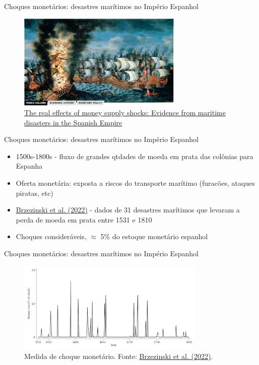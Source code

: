 \documentclass[10pt]{beamer}
\begin{document}
\begin{frame}
    {Choques monetários: desastres marítimos no Império Espanhol}
    \begin{figure}
        \centering
        \includegraphics[width=0.7\textwidth]{./figures/aula3_fig9}
        \caption{\href{https://cepr.org/voxeu/columns/real-effects-money-supply-shocks-evidence-maritime-disasters-spanish-empire}{The real effects of money supply shocks: Evidence from maritime disasters in the Spanish Empire}}
        \label{aula3_fig9}
    \end{figure}
\end{frame}

\begin{frame}
    {Choques monetários: desastres marítimos no Império Espanhol}
    \begin{itemize}
        \item 1500s-1800s - fluxo de grandes qtdades de moeda em prata das colônias para Espanha\bigskip
        \item Oferta monetária: exposta a riscos do transporte marítimo (furacões, ataques piratas, etc)\bigskip
        \item \href{https://cepr.org/publications/dp14089}{Brzezinski et al. (2022)} - dados de 31 desastres marítimos que levaram a perda de moeda em prata entre 1531 e 1810\bigskip
        \item Choques consideráveis, $\approx$ 5\% do estoque monetário espanhol
    \end{itemize}
\end{frame}

\begin{frame}
    {Choques monetários: desastres marítimos no Império Espanhol}
    \begin{figure}
        \centering
        \includegraphics[width=0.8\textwidth]{./figures/aula3_fig6}
        \caption{Medida de choque monetário. Fonte: \href{https://cepr.org/publications/dp14089}{Brzezinski et al. (2022)}.}
        \label{aula3_fig6}
    \end{figure}
\end{frame}
\end{document}

